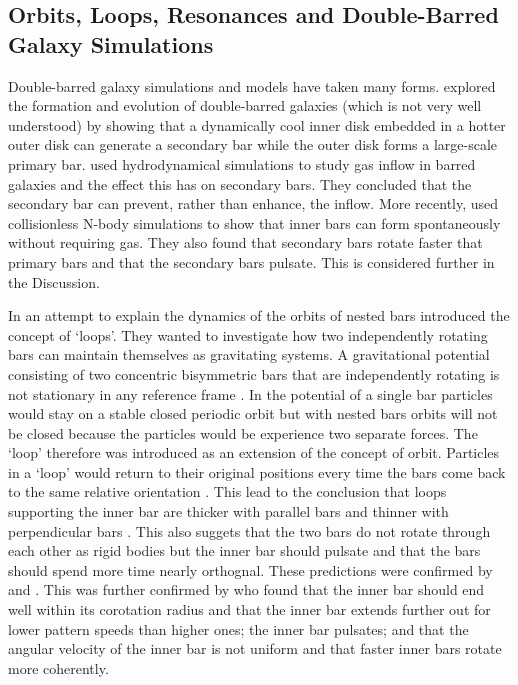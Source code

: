 \documentclass[a4paper,12pt]{article}
\begin{document}
\subsection{Orbits, Loops, Resonances and Double-Barred Galaxy Simulations}
Double-barred galaxy simulations and models have taken many forms. \cite{du1} explored the formation and evolution of double-barred galaxies (which is not very well understood) by showing that a dynamically
cool inner disk embedded in a hotter outer disk can generate a secondary bar while the outer disk forms a large-scale primary bar. \cite{macie8} used hydrodynamical simulations to study gas inflow in barred galaxies
and the effect this has on secondary bars. They concluded that the secondary bar can prevent, rather than enhance, the inflow. More recently, \cite{debattista} used collisionless N-body simulations to show
that inner bars can form spontaneously without requiring gas. They also found that secondary bars rotate faster that primary bars and that the secondary bars pulsate. This is considered further in the Discussion.

In an attempt to explain the dynamics of the orbits of nested bars \cite{macie7} introduced the concept of `loops'. They wanted to investigate how two independently rotating bars can maintain
themselves as gravitating systems. A gravitational potential consisting of two concentric bisymmetric bars that are independently rotating is not stationary in any reference frame \cite{macie7}. In the potential
of a single bar particles would stay on a stable closed periodic orbit but with nested bars orbits will not be closed because the particles would be experience two separate forces. The `loop' therefore was
introduced as an extension of the concept of orbit. Particles in a `loop' would return to their original positions every time the bars come back to the same relative orientation \citep{macie7}. This lead to
the conclusion that loops supporting the inner bar are thicker with parallel bars and thinner with perpendicular bars \citep{macie3}. This also suggets that the two bars do not rotate through each other as rigid bodies
but the inner bar should pulsate and that the bars should spend more time nearly orthognal\citep{macie3}. These predictions were confirmed by \citep{debattista} and \citep{shen1}. 
This was further confirmed by \cite{macie5} who found
that the inner bar should end well within its corotation radius and that the inner bar extends further out for lower pattern speeds than higher ones; the inner bar pulsates; and that the angular velocity of the inner
bar is not uniform and that faster inner bars rotate more coherently.
\end{document}
